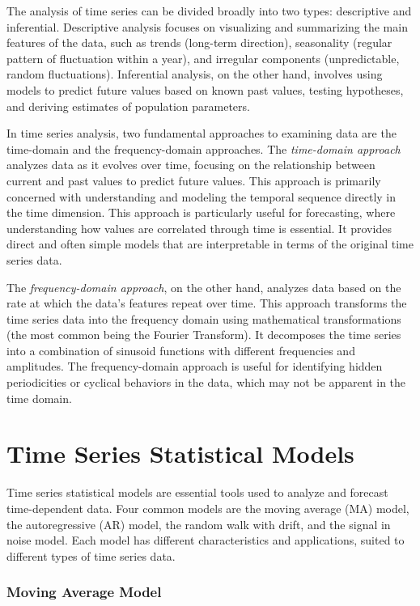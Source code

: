 The analysis of time series can be divided broadly into two types: descriptive and inferential. Descriptive analysis focuses on visualizing and summarizing the main features of the data, such as trends (long-term direction), seasonality (regular pattern of fluctuation within a year), and irregular components (unpredictable, random fluctuations). Inferential analysis, on the other hand, involves using models to predict future values based on known past values, testing hypotheses, and deriving estimates of population parameters.

In time series analysis, two fundamental approaches to examining data are the time-domain and the frequency-domain approaches. The \emph{time-domain approach} analyzes data as it evolves over time, focusing on the relationship between current and past values to predict future values. This approach is primarily concerned with understanding and modeling the temporal sequence directly in the time dimension. This approach is particularly useful for forecasting, where understanding how values are correlated through time is essential. It provides direct and often simple models that are interpretable in terms of the original time series data.

The \emph{frequency-domain approach}, on the other hand, analyzes data based on the rate at which the data's features repeat over time. This approach transforms the time series data into the frequency domain using mathematical transformations (the most common being the Fourier Transform). It decomposes the time series into a combination of sinusoid functions with different frequencies and amplitudes. The frequency-domain approach is useful for identifying hidden periodicities or cyclical behaviors in the data, which may not be apparent in the time domain.

\section{Time Series Statistical Models}

Time series statistical models are essential tools used to analyze and forecast time-dependent data. Four common models are the moving average (MA) model, the autoregressive (AR) model, the random walk with drift, and the signal in noise model. Each model has different characteristics and applications, suited to different types of time series data.

\subsubsection*{Moving Average Model}

